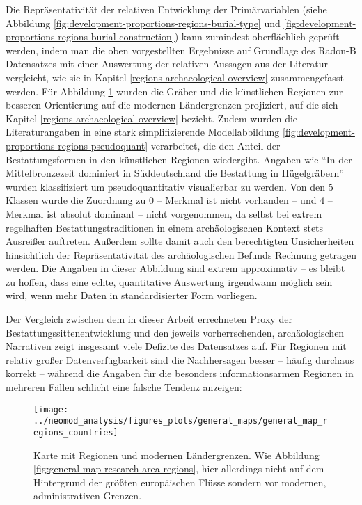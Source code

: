 \documentclass[openany,twoside,twocolumn]{book}
\begin{document}
Die Repräsentativität der relativen Entwicklung der Primärvariablen
(siehe Abbildung \ref{fig:development-proportions-regions-burial-type}
und \ref{fig:development-proportions-regions-burial-construction}) kann
zumindest oberflächlich geprüft werden, indem man die oben vorgestellten
Ergebnisse auf Grundlage des Radon-B Datensatzes mit einer Auswertung
der relativen Aussagen aus der Literatur vergleicht, wie sie in Kapitel
\ref{regions-archaeological-overview} zusammengefasst werden. Für
Abbildung \ref{fig:general-map-regions-countries} wurden die Gräber und
die künstlichen Regionen zur besseren Orientierung auf die modernen
Ländergrenzen projiziert, auf die sich Kapitel
\ref{regions-archaeological-overview} bezieht. Zudem wurden die
Literaturangaben in eine stark simplifizierende Modellabbildung
\ref{fig:development-proportions-regions-pseudoquant} verarbeitet, die
den Anteil der Bestattungsformen in den künstlichen Regionen wiedergibt.
Angaben wie ``In der Mittelbronzezeit dominiert in Süddeutschland die
Bestattung in Hügelgräbern'' wurden klassifiziert um pseudoquantitativ
visualierbar zu werden. Von den 5 Klassen wurde die Zuordnung zu 0 --
Merkmal ist nicht vorhanden -- und 4 -- Merkmal ist absolut dominant --
nicht vorgenommen, da selbst bei extrem regelhaften
Bestattungstraditionen in einem archäologischen Kontext stets Ausreißer
auftreten. Außerdem sollte damit auch den berechtigten Unsicherheiten
hinsichtlich der Repräsentativität des archäologischen Befunds Rechnung
getragen werden. Die Angaben in dieser Abbildung sind extrem
approximativ -- es bleibt zu hoffen, dass eine echte, quantitative
Auswertung irgendwann möglich sein wird, wenn mehr Daten in
standardisierter Form vorliegen.

Der Vergleich zwischen dem in dieser Arbeit errechneten Proxy der
Bestattungssittenentwicklung und den jeweils vorherrschenden,
archäologischen Narrativen zeigt insgesamt viele Defizite des
Datensatzes auf. Für Regionen mit relativ großer Datenverfügbarkeit sind
die Nachhersagen besser -- häufig durchaus korrekt -- während die
Angaben für die besonders informationsarmen Regionen in mehreren Fällen
schlicht eine falsche Tendenz anzeigen:

\begin{figure}
\texttt{[image: ../neomod\_analysis/figures\_plots/general\_maps/general\_map\_regions\_countries]} \caption[Karte mit Regionen und modernen Ländergrenzen]{Karte mit Regionen und modernen Ländergrenzen. Wie Abbildung \ref{fig:general-map-research-area-regions}, hier allerdings nicht auf dem Hintergrund der größten europäischen Flüsse sondern vor modernen, administrativen Grenzen.}\label{fig:general-map-regions-countries}
\end{figure}
\end{document}
